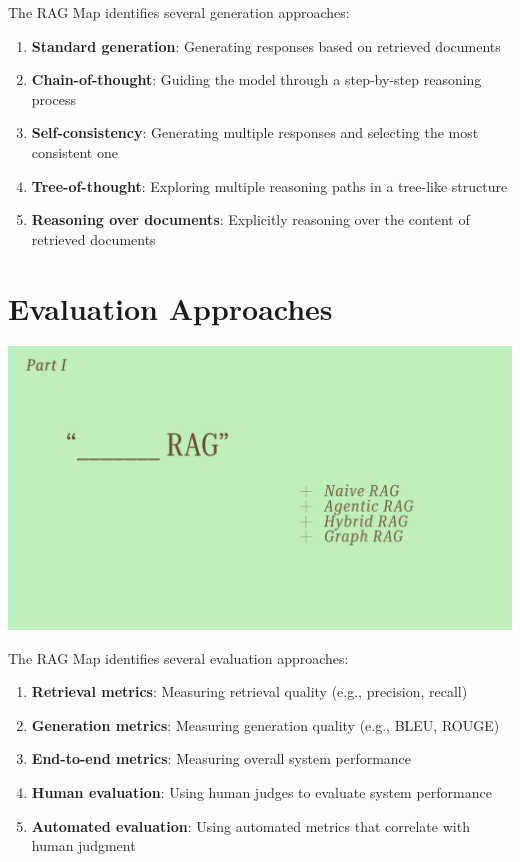 \documentclass[
  letterpaper,
  oneside]{scrbook}
\providecommand{\tightlist}{%
  \setlength{\itemsep}{0pt}\setlength{\parskip}{0pt}}\usepackage{longtable,booktabs,array}
\begin{document}
The RAG Map identifies several generation approaches:

\begin{enumerate}
\def\labelenumi{\arabic{enumi}.}
\tightlist
\item
  \textbf{Standard generation}: Generating responses based on retrieved
  documents
\item
  \textbf{Chain-of-thought}: Guiding the model through a step-by-step
  reasoning process
\item
  \textbf{Self-consistency}: Generating multiple responses and selecting
  the most consistent one
\item
  \textbf{Tree-of-thought}: Exploring multiple reasoning paths in a
  tree-like structure
\item
  \textbf{Reasoning over documents}: Explicitly reasoning over the
  content of retrieved documents
\end{enumerate}

\section{Evaluation Approaches}\label{evaluation-approaches}

\includegraphics{chapters/../p5-images/slide_6.png}

The RAG Map identifies several evaluation approaches:

\begin{enumerate}
\def\labelenumi{\arabic{enumi}.}
\tightlist
\item
  \textbf{Retrieval metrics}: Measuring retrieval quality (e.g.,
  precision, recall)
\item
  \textbf{Generation metrics}: Measuring generation quality (e.g., BLEU,
  ROUGE)
\item
  \textbf{End-to-end metrics}: Measuring overall system performance
\item
  \textbf{Human evaluation}: Using human judges to evaluate system
  performance
\item
  \textbf{Automated evaluation}: Using automated metrics that correlate
  with human judgment
\end{enumerate}
\end{document}
